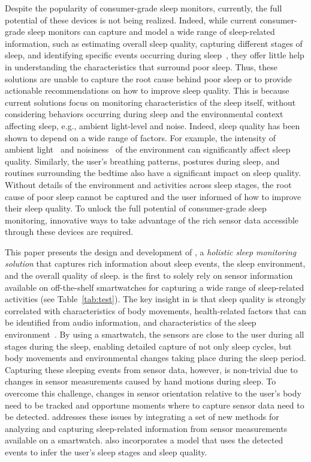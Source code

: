 Despite the popularity of consumer-grade sleep monitors, currently, the full potential of these devices is not being realized. Indeed, while current consumer-grade sleep monitors can capture and model a wide range of sleep-related information, such as estimating overall sleep quality, capturing different stages of sleep, and identifying specific events occurring during
sleep~\cite{kay2012lullaby,zhang2013real,sleepmonitor}, they offer little help in understanding the characteristics that surround poor sleep. Thus, these solutions are unable to capture the root cause behind poor sleep or to provide {actionable} recommendations on how to improve sleep quality. This is because current solutions focus on monitoring characteristics of the sleep itself, without considering behaviors occurring during sleep and the environmental context affecting sleep, e.g., ambient light-level and noise. Indeed, sleep quality has been shown to depend on a wide range of factors. For example, the intensity of ambient light~\cite{hood04determinants} and noisiness~\cite{muzet2007environmental} of the environment can significantly affect sleep quality. Similarly, the user's breathing patterns, postures during sleep, and routines surrounding the bedtime also have a significant impact on sleep quality. Without details of the environment and activities across sleep stages, the root cause of poor sleep cannot be captured and the user informed of how to improve their sleep quality. To unlock the full potential of consumer-grade sleep monitoring, innovative ways to take advantage of the rich sensor data accessible through these devices are required.

This paper presents the design and development of {\systemname}, a \emph{holistic sleep monitoring solution} that captures rich information
about sleep events, the sleep environment, and the overall quality of sleep. {\systemname} is the first to solely rely on sensor
information available on off-the-shelf smartwatches for capturing a wide range of sleep-related activities (see Table~\ref{tab:test}). The
key insight in {\systemname} is that sleep quality is strongly correlated with characteristics of body movements, health-related factors
that can be identified from audio information, and characteristics of the sleep environment~\cite{shelgikar2016sleep}. By using a
smartwatch, the sensors are close to the user during all stages during the sleep, enabling detailed capture of not only sleep cycles, but
body movements and environmental changes taking place during the sleep period. Capturing these sleeping events from sensor data, however,
is non-trivial due to changes in sensor measurements caused by hand motions during sleep. To overcome this challenge, changes in sensor
orientation relative to the user's body need to be tracked and opportune moments where to capture sensor data need to be detected.
{\systemname} addresses these issues by integrating a set of new methods for analyzing and capturing sleep-related information from sensor
measurements available on a smartwatch. {\systemname} also incorporates a model that uses the detected events to infer the user's sleep
stages and sleep quality.

